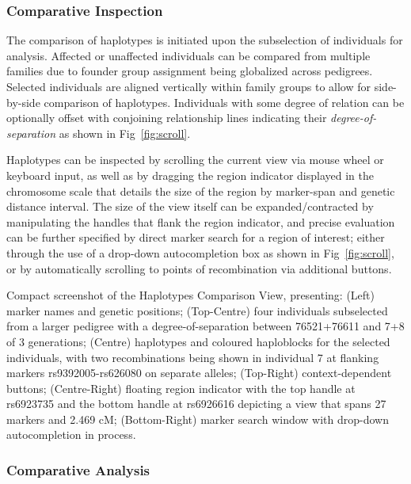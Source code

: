 \subsubsection{Comparative Inspection}

The comparison of haplotypes is initiated upon the subselection of individuals for analysis. Affected or unaffected individuals can be compared from multiple families due to founder group assignment being globalized across pedigrees. Selected individuals are aligned vertically within family groups to allow for side-by-side comparison of haplotypes. Individuals with some degree of relation can be optionally offset with conjoining relationship lines indicating their \textit{degree-of-separation} as shown in Fig~\ref{fig:scroll}.

Haplotypes can be inspected by scrolling the current view via mouse wheel or keyboard input, as well as by dragging the region indicator displayed in the chromosome scale that details the size of the region by marker-span and genetic distance interval. The size of the view itself can be expanded/contracted by manipulating the handles that flank the region indicator, and precise evaluation can be further specified by direct marker search for a region of interest; either through the use of a drop-down autocompletion box as shown in Fig~\ref{fig:scroll}, or by automatically scrolling to points of recombination via additional buttons.

	{Compact screenshot of the Haplotypes Comparison View, presenting: (Left) marker names and genetic positions; (Top-Centre) four individuals subselected from a larger pedigree with a degree-of-separation between 76521+76611 and 7+8 of 3 generations; (Centre) haplotypes and coloured haploblocks for the selected individuals, with two recombinations being shown in individual 7 at flanking markers rs9392005-rs626080 on separate alleles; (Top-Right) context-dependent buttons; (Centre-Right) floating region indicator with the top handle at rs6923735 and the bottom handle at rs6926616 depicting a view that spans 27 markers and 2.469 cM; (Bottom-Right) marker search window with drop-down autocompletion in process.}

\subsubsection{Comparative Analysis}


